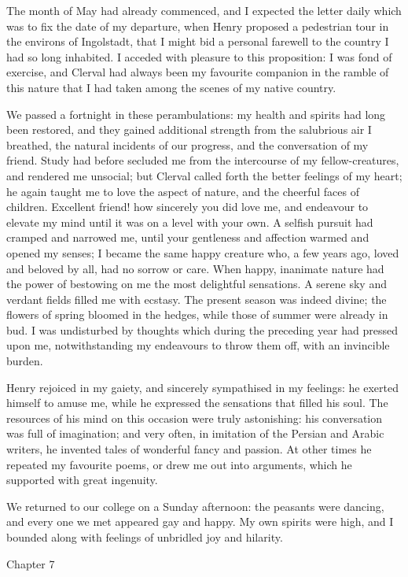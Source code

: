 \documentclass[12pt,openright]{book}
\begin{document}
The month of May had already commenced, and I expected the letter daily which was to fix the date of my departure, when Henry proposed a pedestrian tour in the environs of Ingolstadt, that I might bid a personal farewell to the country I had so long inhabited. I acceded with pleasure to this proposition: I was fond of exercise, and Clerval had always been my favourite companion in the ramble of this nature that I had taken among the scenes of my native country.

We passed a fortnight in these perambulations: my health and spirits had long been restored, and they gained additional strength from the salubrious air I breathed, the natural incidents of our progress, and the conversation of my friend. Study had before secluded me from the intercourse of my fellow-creatures, and rendered me unsocial; but Clerval called forth the better feelings of my heart; he again taught me to love the aspect of nature, and the cheerful faces of children. Excellent friend! how sincerely you did love me, and endeavour to elevate my mind until it was on a level with your own. A selfish pursuit had cramped and narrowed me, until your gentleness and affection warmed and opened my senses; I became the same happy creature who, a few years ago, loved and beloved by all, had no sorrow or care. When happy, inanimate nature had the power of bestowing on me the most delightful sensations. A serene sky and verdant fields filled me with ecstasy. The present season was indeed divine; the flowers of spring bloomed in the hedges, while those of summer were already in bud. I was undisturbed by thoughts which during the preceding year had pressed upon me, notwithstanding my endeavours to throw them off, with an invincible burden.

Henry rejoiced in my gaiety, and sincerely sympathised in my feelings: he exerted himself to amuse me, while he expressed the sensations that filled his soul. The resources of his mind on this occasion were truly astonishing: his conversation was full of imagination; and very often, in imitation of the Persian and Arabic writers, he invented tales of wonderful fancy and passion. At other times he repeated my favourite poems, or drew me out into arguments, which he supported with great ingenuity.

We returned to our college on a Sunday afternoon: the peasants were dancing, and every one we met appeared gay and happy. My own spirits were high, and I bounded along with feelings of unbridled joy and hilarity.

Chapter 7
\end{document}
